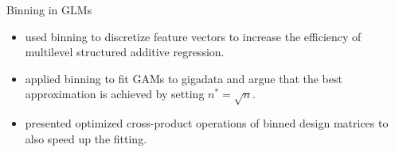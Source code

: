 \documentclass[t,10pt]{beamer}
\begin{document}
\begin{frame}{Binning in GLMs}
  \begin{itemize}
    \item
      \citet{lang2014multilevel} used binning to discretize feature vectors
      to increase the efficiency of multilevel structured additive
      regression.
    \item
      \citet{wood2017gigadata} applied binning to fit GAMs to gigadata and
      argue that the best approximation is achieved by setting
      \(n^\ast = \sqrt{n}\).
    \item
      \citet{li2020faster} presented optimized cross-product operations of
      binned design matrices to also speed up the fitting.
  \end{itemize}
\end{frame}
\end{document}
